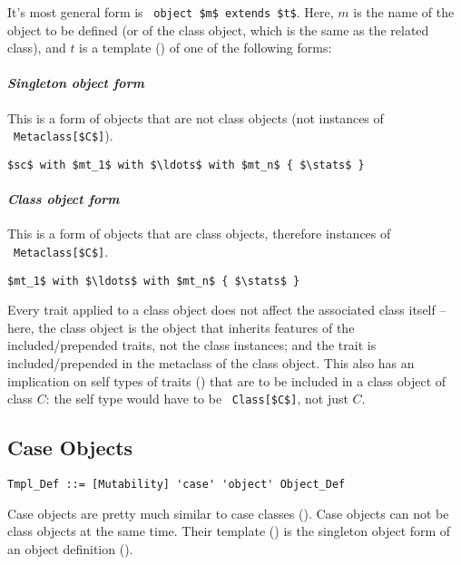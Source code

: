 It's most general form is ~\lstinline!object $m$ extends $t$!. Here, $m$ is the name of the object to be defined (or of the class object, which is the same as the related class), and $t$ is a template () of one of the following forms:

\paragraph{\em Singleton object form}
This is a form of objects that are not class objects (not instances of ~\lstinline!Metaclass[$C$]!). 
\begin{lstlisting}
$sc$ with $mt_1$ with $\ldots$ with $mt_n$ { $\stats$ }
\end{lstlisting}

\paragraph{\em Class object form}
This is a form of objects that are class objects, therefore instances of ~\lstinline!Metaclass[$C$]!. 
\begin{lstlisting}
$mt_1$ with $\ldots$ with $mt_n$ { $\stats$ }
\end{lstlisting}

Every trait applied to a class object does not affect the associated class itself -- here, the class object is the object that inherits features of the included/prepended traits, not the class instances; and the trait is included/prepended in the metaclass of the class object. This also has an implication on self types of traits () that are to be included in a class object of class $C$: the self type would have to be ~\lstinline!Class[$C$]!, not just $C$. 






\subsection{Case Objects}
\label{sec:case-objects}

\syntax\begin{lstlisting}
Tmpl_Def ::= [Mutability] 'case' 'object' Object_Def
\end{lstlisting}

Case objects are pretty much similar to case classes (). Case objects can not be class objects at the same time. Their template () is the singleton object form of an object definition (). 

